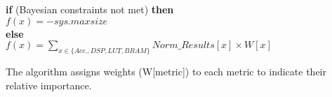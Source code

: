 \vspace{0.2cm}
\textbf{if} (Bayesian constraints not met) \textbf{then} \\
\indent \indent $f(x)=-sys.maxsize$ \\
\indent \textbf{else} \\
\indent \indent $f(x) = 
\sum_{x \in \{Acc.,  DSP, LUT, BRAM \}} Norm\_Results[x]  \times W[x]$
\vspace{0.2cm}

The algorithm assigns weights (W[metric]) to each metric to indicate their relative importance. 
